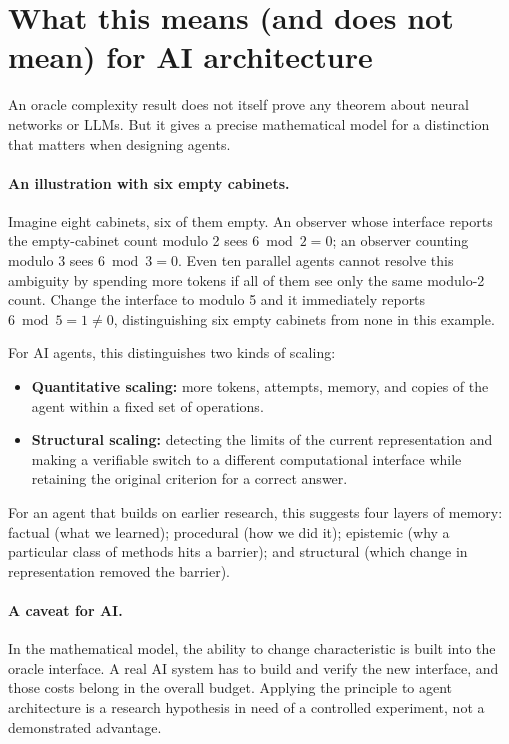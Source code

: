 \documentclass[11pt,a4paper]{article}
\begin{document}
\section{What this means (and does not mean) for AI architecture}
An oracle complexity result does not itself prove any theorem about neural networks or LLMs. But it gives a precise mathematical model for a distinction that matters when designing agents.

\paragraph{An illustration with six empty cabinets.}
Imagine eight cabinets, six of them empty. An observer whose interface reports the empty-cabinet count modulo 2 sees \(6\bmod 2=0\); an observer counting modulo 3 sees \(6\bmod 3=0\). Even ten parallel agents cannot resolve this ambiguity by spending more tokens if all of them see only the same modulo-2 count. Change the interface to modulo 5 and it immediately reports \(6\bmod 5=1\ne 0\), distinguishing six empty cabinets from none in this example.

For AI agents, this distinguishes two kinds of scaling:
\begin{itemize}
\item \textbf{Quantitative scaling:} more tokens, attempts, memory, and copies of the agent within a fixed set of operations.
\item \textbf{Structural scaling:} detecting the limits of the current representation and making a verifiable switch to a different computational interface while retaining the original criterion for a correct answer.
\end{itemize}

For an agent that builds on earlier research, this suggests four layers of memory: factual (what we learned); procedural (how we did it); epistemic (why a particular class of methods hits a barrier); and structural (which change in representation removed the barrier).

\paragraph{A caveat for AI.}
In the mathematical model, the ability to change characteristic is built into the oracle interface. A real AI system has to build and verify the new interface, and those costs belong in the overall budget. Applying the principle to agent architecture is a research hypothesis in need of a controlled experiment, not a demonstrated advantage.
\end{document}
